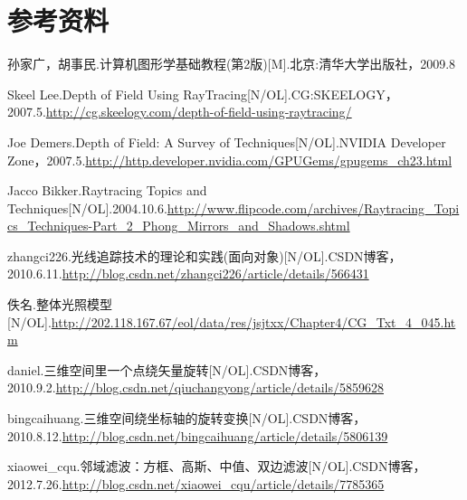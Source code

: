 \section{参考资料}
\begin{enumerate}[ label={[\arabic*]} ]
\item
孙家广，胡事民.计算机图形学基础教程(第2版)[M].北京:清华大学出版社，2009.8
\item
Skeel Lee.Depth of Field Using RayTracing[N/OL].CG:SKEELOGY，2007.5.\url{http://cg.skeelogy.com/depth-of-field-using-raytracing/}
\item
Joe Demers.Depth of Field: A Survey of Techniques[N/OL].NVIDIA Developer Zone，2007.5.\url{http://http.developer.nvidia.com/GPUGems/gpugems_ch23.html}
\item
Jacco Bikker.Raytracing Topics and Techniques[N/OL].2004.10.6.\url{http://www.flipcode.com/archives/Raytracing_Topics_Techniques-Part_2_Phong_Mirrors_and_Shadows.shtml}
\item
zhangci226.光线追踪技术的理论和实践(面向对象)[N/OL].CSDN博客，2010.6.11.\url{http://blog.csdn.net/zhangci226/article/details/566431}
\item
佚名.整体光照模型[N/OL].\url{http://202.118.167.67/eol/data/res/jsjtxx/Chapter4/CG_Txt_4_045.htm}
\item
daniel.三维空间里一个点绕矢量旋转[N/OL].CSDN博客，2010.9.2.\url{http://blog.csdn.net/qiuchangyong/article/details/5859628}
\item
bingcaihuang.三维空间绕坐标轴的旋转变换[N/OL].CSDN博客，2010.8.12.\url{http://blog.csdn.net/bingcaihuang/article/details/5806139}
\item
xiaowei\_cqu.邻域滤波：方框、高斯、中值、双边滤波[N/OL].CSDN博客，2012.7.26.\url{http://blog.csdn.net/xiaowei_cqu/article/details/7785365}

\end{enumerate}




